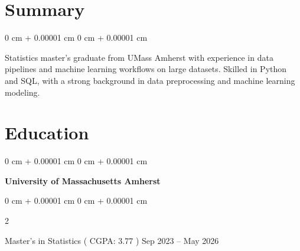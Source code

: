 \documentclass[10pt, letterpaper]{article}
\newenvironment{highlightsforbulletentries}{
    \begin{itemize}[
        topsep=0.10 cm,
        parsep=0.10 cm,
        partopsep=0pt,
        itemsep=0pt,
        leftmargin=10pt
    ]
}{
    \end{itemize}
} %
\newenvironment{onecolentry}{
    \begin{adjustwidth}{
        0 cm + 0.00001 cm
    }{
        0 cm + 0.00001 cm
    }
}{
    \end{adjustwidth}
} %
\newenvironment{twocolentry}[2][]{
    \onecolentry
    \def\secondColumn{#2}
    \setcolumnwidth{\fill, 4.5 cm}
    \begin{paracol}{2}
}{
    \switchcolumn \raggedleft \secondColumn
    \end{paracol}
    \endonecolentry
} %
\begin{document}
    








    \section{Summary} 
        \begin{onecolentry}
         Statistics master's graduate from UMass Amherst with experience in data pipelines and machine learning workflows on large datasets. Skilled in Python and SQL, with a strong background in data preprocessing and machine learning modeling.
        \end{onecolentry}
        
    \section{Education}

        \begin{onecolentry}
        \textbf{University of Massachusetts Amherst}
        \end{onecolentry}
        
        \begin{twocolentry}{
            Sep 2023 – May 2026
        }
    Master's in Statistics ( CGPA: 3.77 )\end{twocolentry}
  
\end{document}
